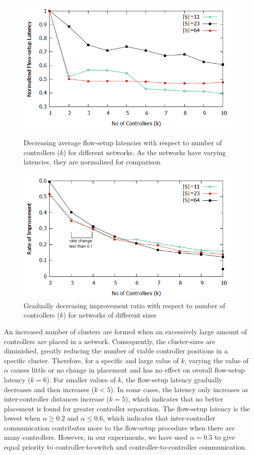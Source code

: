 \documentclass[final,5p,times]{cas-dc}
\begin{document}
	\begin{figure}[t]
		\centering
		\includegraphics[width=0.95\linewidth]{Images/k_vs_l.png}
		\caption{Decreasing average flow-setup latencies with respect to number of controllers ($k$) for different networks. As the networks have varying latencies, they are normalized for comparison.} \label{fig:KvsL}
		\centering
		\includegraphics[width=0.95\linewidth]{Images/cutoff.png}
		\caption{Gradually decreasing improvement ratio with respect to number of controllers ($k$) for networks of different sizes} \label{fig:cutoff}
	\end{figure}

	An increased number of clusters are formed when an excessively large amount of controllers are placed in a network. Consequently, the cluster-sizes are diminished, greatly reducing the number of viable controller positions in a specific cluster. Therefore, for a specific and large value of $k$, varying the value of $\alpha$ causes little or no change in placement and has no effect on overall flow-setup latency ($k=6$). For smaller values of $k$, the flow-setup latency gradually decreases and then increases ($k<5$). In some cases, the latency only increases as inter-controller distances increase ($k=5$), which indicates that no better placement is found for greater controller separation. The flow-setup latency is the lowest when $\alpha \ge 0.2$ and $\alpha \le 0.6$, which indicates that inter-controller communication contributes more to the flow-setup procedure when there are many controllers. However, in our experiments, we have used $\alpha=0.5$ to give equal priority to controller-to-switch and controller-to-controller communication.
	
\end{document}

